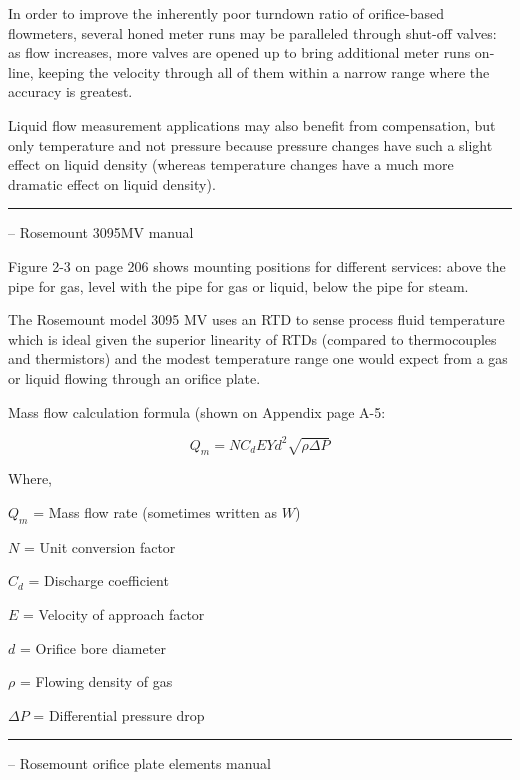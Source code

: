 \vskip 10pt

In order to improve the inherently poor turndown ratio of orifice-based flowmeters, several honed meter runs may be paralleled through shut-off valves: as flow increases, more valves are opened up to bring additional meter runs on-line, keeping the velocity through all of them within a narrow range where the accuracy is greatest.

\vskip 10pt

Liquid flow measurement applications may also benefit from compensation, but only temperature and not pressure because pressure changes have such a slight effect on liquid density (whereas temperature changes have a much more dramatic effect on liquid density).


\filbreak \vskip 5pt \hrule \vskip 5pt  -- Rosemount 3095MV manual \vskip 10pt

Figure 2-3 on page 206 shows mounting positions for different services: above the pipe for gas, level with the pipe for gas or liquid, below the pipe for steam.

\vskip 10pt

The Rosemount model 3095 MV uses an RTD to sense process fluid temperature which is ideal given the superior linearity of RTDs (compared to thermocouples and thermistors) and the modest temperature range one would expect from a gas or liquid flowing through an orifice plate.

\vskip 10pt

Mass flow calculation formula (shown on Appendix page A-5:

$$Q_m = N C_d E Y d^2 \sqrt{\rho \Delta P}$$

\noindent
Where,

$Q_m$ = Mass flow rate (sometimes written as $W$)

$N$ = Unit conversion factor

$C_d$ = Discharge coefficient

$E$ = Velocity of approach factor

$d$ = Orifice bore diameter

$\rho$ = Flowing density of gas

$\Delta P$ = Differential pressure drop


\filbreak \vskip 5pt \hrule \vskip 5pt  -- Rosemount orifice plate elements manual \vskip 10pt

